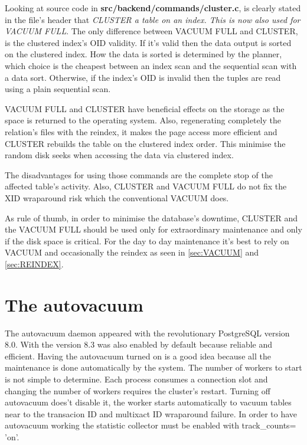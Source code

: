 Looking at source code in \textbf{src/backend/commands/cluster.c}, is clearly stated in the 
file's header that \textit{CLUSTER a table on an index.  This is now also used for VACUUM FULL}. 
The only difference between VACUUM FULL and CLUSTER, is the clustered index's OID validity. If 
it's valid then the data output is sorted on the clustered index. How the data is sorted is 
determined by the planner, which choice is the cheapest between an index scan and the sequential 
scan with a data sort. Otherwise, if the index's OID is invalid then the tuples are read using a 
plain sequential scan.\newline

VACUUM FULL and CLUSTER have beneficial effects on the storage as the space is returned to the 
operating system. Also, regenerating completely the relation's files with the reindex, it makes the 
page access more efficient and CLUSTER rebuilds the table on the clustered index order. This 
minimise the random disk seeks when accessing the data via clustered index.\newline

The disadvantages for using those commands are the complete stop of the affected table's activity. 
Also, CLUSTER and VACUUM FULL do not fix the XID wraparound risk which the conventional VACUUM 
does.\newline

As rule of thumb, in order to minimise the database's downtime, CLUSTER and the VACUUM FULL should 
be used only for extraordinary maintenance and only if the disk space is critical. For the day to 
day maintenance it's best to rely on VACUUM and occasionally the reindex as seen in \ref{sec:VACUUM} 
and \ref{sec:REINDEX}.
 


\section{The autovacuum}
\label{sec:AUTOVACUUM}
The autovacuum daemon appeared with the revolutionary PostgreSQL version 8.0. With the version 8.3 
was also enabled by default because reliable and efficient. Having the autovacuum turned on is a 
good idea because all the maintenance is done automatically by the system. The number of workers to 
start is not simple to determine. Each process consumes a connection slot and changing the 
number of workers requires the cluster's restart. Turning off autovacuum does't disable it, the 
worker starts automatically to vacuum tables near to the transacion ID and multixact ID wraparound 
failure. In order to have autovacuum working the statistic collector must be enabled with 
track\_counts= 'on'.\newline



